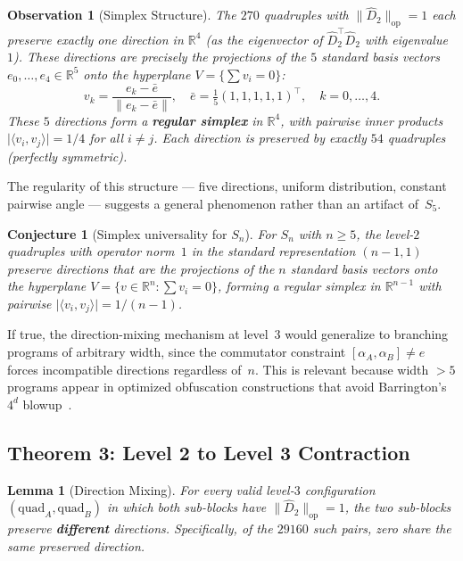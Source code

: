 \documentclass[11pt]{article}
\newtheorem{lemma}[theorem]{Lemma}
\newtheorem{observation}[theorem]{Observation}
\newtheorem{conjecture}[theorem]{Conjecture}
\newcommand{\norm}[1]{\lVert #1 \rVert}
\newcommand{\abs}[1]{\lvert #1 \rvert}
\newcommand{\opn}[1]{\norm{#1}_{\mathrm{op}}}
\newcommand{\Dhat}{\widehat{D}}
\begin{document}
\begin{observation}[Simplex Structure]
\label{obs:simplex}
The $270$ quadruples with $\opn{\Dhat_2} = 1$ each preserve exactly one direction
in $\mathbb{R}^4$ (as the eigenvector of $\Dhat_2^\top \Dhat_2$ with eigenvalue $1$).
These directions are precisely the projections of the $5$ standard basis vectors
$e_0, \ldots, e_4 \in \mathbb{R}^5$ onto the hyperplane $V = \{\sum v_i = 0\}$:
\[
v_k = \frac{e_k - \bar{e}}{\norm{e_k - \bar{e}}}, \quad
\bar{e} = \tfrac{1}{5}(1,1,1,1,1)^\top, \quad k = 0, \ldots, 4.
\]
These $5$ directions form a \textbf{regular simplex} in $\mathbb{R}^4$, with
pairwise inner products $\abs{\langle v_i, v_j \rangle} = 1/4$ for all $i \neq j$.
Each direction is preserved by exactly $54$ quadruples (perfectly symmetric).
\end{observation}

The regularity of this structure --- five directions, uniform distribution,
constant pairwise angle --- suggests a general phenomenon rather than
an artifact of~$S_5$.

\begin{conjecture}[Simplex universality for $S_n$]
\label{conj:simplex}
For $S_n$ with $n \geq 5$, the level-$2$ quadruples with operator norm~$1$
in the standard representation $(n-1,1)$ preserve directions that are
the projections of the $n$ standard basis vectors onto the hyperplane
$V = \{v \in \mathbb{R}^n : \sum v_i = 0\}$, forming a regular simplex
in $\mathbb{R}^{n-1}$ with pairwise $\abs{\langle v_i, v_j \rangle} = 1/(n-1)$.
\end{conjecture}

If true, the direction-mixing mechanism at level~$3$ would generalize
to branching programs of arbitrary width, since the commutator constraint
$[\alpha_A, \alpha_B] \neq e$ forces incompatible directions regardless
of~$n$.  This is relevant because width $> 5$ programs appear in optimized
obfuscation constructions that avoid Barrington's $4^d$
blowup~\cite{AGIS14}.


\subsection{Theorem 3: Level 2 to Level 3 Contraction}

\begin{lemma}[Direction Mixing]
\label{lem:mixing}
For every valid level-$3$ configuration $(\mathrm{quad}_A, \mathrm{quad}_B)$
in which both sub-blocks have $\opn{\Dhat_2} = 1$, the two sub-blocks
preserve \textbf{different} directions. Specifically, of the $29160$ such pairs,
zero share the same preserved direction.
\end{lemma}
\end{document}
